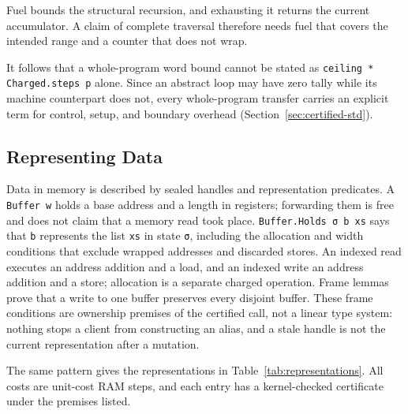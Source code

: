 \documentclass[acmsmall,nonacm]{acmart}
\begin{document}
Fuel bounds the structural recursion, and exhausting it returns the current accumulator.
A claim of complete traversal therefore needs fuel that covers the intended range and a counter that does not wrap.

It follows that a whole-program word bound cannot be stated as \lstinline{ceiling * Charged.steps p} alone.
Since an abstract loop may have zero tally while its machine counterpart does not, every whole-program transfer carries an explicit term for control, setup, and boundary overhead (Section~\ref{sec:certified-std}).

\subsection{Representing Data}\label{sec:representations}

Data in memory is described by sealed handles and representation predicates.
A \lstinline{Buffer w} holds a base address and a length in registers; forwarding them is free and does not claim that a memory read took place.
\lstinline{Buffer.Holds σ b xs} says that \lstinline{b} represents the list \lstinline{xs} in state \lstinline{σ}, including the allocation and width conditions that exclude wrapped addresses and discarded stores.
An indexed read executes an address addition and a load, and an indexed write an address addition and a store; allocation is a separate charged operation.
Frame lemmas prove that a write to one buffer preserves every disjoint buffer.
These frame conditions are ownership premises of the certified call, not a linear type system: nothing stops a client from constructing an alias, and a stale handle is not the current representation after a mutation.

The same pattern gives the representations in Table~\ref{tab:representations}.
All costs are unit-cost RAM steps, and each entry has a kernel-checked certificate under the premises listed.
\end{document}
